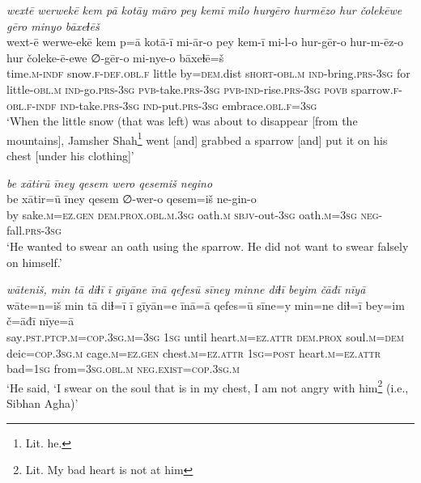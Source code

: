 \ea \label{DP.36}
\textit{wextē werwekē kem pā kotāy māro pey kemī milo hurgēro hurmēzo hur čolekēwe gēro minyo bāxeɫēš} \\ 
\gll wext-ē werwe-ekē kem p=ā kotā-ī mi-ār-o pey kem-ī mi-l-o hur-gēr-o hur-m-ēz-o hur čoleke-ē-ewe ∅-gēr-o mi-nye-o bāxeɫē=š \\ 
 time\textsc{.m}\textsc{-indf} snow\textsc{\textsc{.f}}\textsc{-def}\textsc{.obl}\textsc{\textsc{.f}} little by\textsc{=dem}.dist s\textsc{hort}\textsc{-obl}\textsc{.m} \textsc{ind-}bring\textsc{.prs}\textsc{-3sg} for little\textsc{-obl}\textsc{.m} \textsc{ind-}go\textsc{.prs}\textsc{-3sg} \textsc{pvb-}take\textsc{.prs}\textsc{-3sg} \textsc{pvb-}\textsc{ind-}rise\textsc{.prs}\textsc{-3sg} \textsc{povb} sparrow\textsc{\textsc{.f}}\textsc{-obl}\textsc{\textsc{.f}}\textsc{-indf} \textsc{ind-}take\textsc{.prs}\textsc{-3sg} \textsc{ind-}put\textsc{.prs}\textsc{-3sg} embrace\textsc{.obl}\textsc{\textsc{.f}}\textsc{=3sg} \\ 
\glt `When the little snow (that was left) was about to disappear [from the mountains], Jamsher Shah\footnote{Lit. he.} went [and] grabbed a sparrow [and] put it on his chest [under his clothing]'
\z 
 
\ea \label{DP.37}
\textit{be xātirū īney qesem wero qesemiš negino} \\ 
\gll be xātir=ū īney qesem ∅-wer-o qesem=iš ne-gin-o \\ 
 by sake\textsc{.m}\textsc{=ez}\textsc{.gen} \textsc{dem.prox}\textsc{.obl}\textsc{.m}\textsc{.3sg} oath\textsc{.m} \textsc{sbjv-}out\textsc{-3sg} oath\textsc{.m}\textsc{=3sg} \textsc{neg-}fall\textsc{.prs}\textsc{-3sg} \\ 
\glt `He wanted to swear an oath using the sparrow. He did not want to swear falsely on himself.'
\z 
 
\ea \label{DP.38}
\textit{wāteniš, min tā diɫī ī gīyāne īnā qefesū sīney minne diɫī beyim čāđī nīyā} \\ 
\gll wāte=n=iš min tā diɫ=ī ī gīyān=e īnā=ā qefes=ū sīne=y min=ne diɫ=ī bey=im č=āđī nīye=ā \\ 
 say\textsc{.pst}\textsc{.ptcp}\textsc{.m}\textsc{=cop}\textsc{.3sg}\textsc{.m}\textsc{=3sg} \textsc{1sg} until heart\textsc{.m}\textsc{=ez}.\textsc{attr} \textsc{dem.prox} soul\textsc{.m}\textsc{=dem} deic\textsc{=cop}\textsc{.3sg}\textsc{.m} cage\textsc{.m}\textsc{=ez}\textsc{.gen} chest\textsc{.m}\textsc{=ez}.\textsc{attr} \textsc{1sg}\textsc{=\textsc{post}} heart\textsc{.m}\textsc{=ez}.\textsc{attr} bad\textsc{=1sg} from\textsc{=3sg}\textsc{.obl}\textsc{.m} \textsc{\textsc{neg.}exist}\textsc{=cop}\textsc{.3sg}\textsc{.m} \\ 
\glt `He said, ‘I swear on the soul that is in my chest, I am not angry with him\footnote{Lit. My bad heart is not at him} (i.e., Sibhan Agha)'
\z 
 
